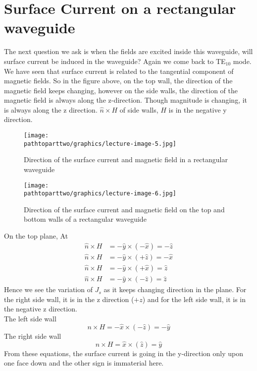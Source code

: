 \section{Surface Current on a rectangular waveguide}
The next question we ask is when the fields are excited inside this waveguide, will surface current be induced in the waveguide? Again we come back to TE$_{10}$ mode. We have seen that surface current is related to the tangential component of magnetic fields. So in the figure above, on the top wall, the direction of the magnetic field keeps changing, however on the side walls, the direction of the magnetic field is always along the z-direction. Though magnitude is changing, it is always along the z direction. $\hat{n} \times H$ of side walls, $H$ is in the negative y direction.
\begin{figure}[h]
\centering
\texttt{[image: \\pathtoparttwo/graphics/lecture-image-5.jpg]}
\label{fig:lectureimage5}
\caption{Direction of the surface current and magnetic field in a rectangular waveguide}
\end{figure}
\begin{figure}[h]
\centering
\texttt{[image: \\pathtoparttwo/graphics/lecture-image-6.jpg]}
\label{fig:lectureimage6}
\caption{Direction of the surface current and magnetic field on the top and bottom walls of a rectangular waveguide}
\end{figure}

On the top plane, At
\begin{align*}
\hat{n} \times H &= -\hat{y} \times (-\hat{x})= -\hat{z}\\
\hat{n} \times H &= -\hat{y} \times (+\hat{z})= -\hat{x}\\
\hat{n} \times H &= -\hat{y} \times (+\hat{x})= \hat{z}\\
\hat{n} \times H &= -\hat{y} \times (-\hat{z})= \hat{z}
\end{align*}
Hence we see the variation of $J_{s}$ as it keeps changing direction in the plane. For the right side wall, it is in the z direction ($+z$) and for the left side wall, it is in the negative z direction.\\
The left side wall   
\begin{equation}
n\times H = -\hat{x} \times (-\hat{z})= -\hat{y}
\label{eqn:negy}
\end{equation}
The right side wall 
\begin{equation}
n \times H = \hat{x} \times (\hat{z}) = \hat{y}
\label{eqn:posy}
\end{equation}
From these equations, the surface current is going in the y-direction only upon one face down and the other sign is immaterial here.
	
